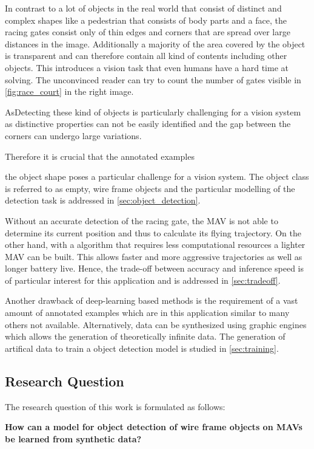 In contrast to a lot of objects in the real world that consist of distinct and complex shapes like a pedestrian that consists of body parts and a face, the racing gates consist only of thin edges and corners that are spread over large distances in the image. Additionally a majority of the area covered by the object is transparent and can therefore contain all kind of contents including other objects. This introduces a vision task that even humans have a hard time at solving. The unconvinced reader can try to count the number of gates visible in \autoref{fig:race_court} in the right image.

AsDetecting these kind of objects is particularly challenging for a vision system as distinctive properties can not be easily identified and the gap between the corners can undergo large variations. 

Therefore it is crucial that the annotated examples

 the object shape poses a particular challenge for a vision system. The object class is referred to as empty, wire frame objects and the particular modelling of the detection task is addressed in \autoref{sec:object_detection}. 

Without an accurate detection of the racing gate, the \ac{MAV} is not able to determine its current position and thus to calculate its flying trajectory. On the other hand, with a algorithm that requires less computational resources a lighter \ac{MAV} can be built. This allows faster and more aggressive trajectories as well as longer battery live. Hence, the trade-off between accuracy and inference speed is of particular interest for this application and is addressed in \autoref{sec:tradeoff}.

Another drawback of deep-learning based methods is the requirement of a vast amount of annotated examples which are in this application similar to many others not available. Alternatively, data can be synthesized using graphic engines which allows the generation of theoretically infinite data. The generation of artifical data to train a object detection model is studied in \autoref{sec:training}.

\subsection*{Research Question}

The research question of this work is formulated as follows:
\begin{center}
	\textbf{How can a model for object detection of wire frame objects on \acp{MAV} be learned from synthetic data?}
\end{center}


